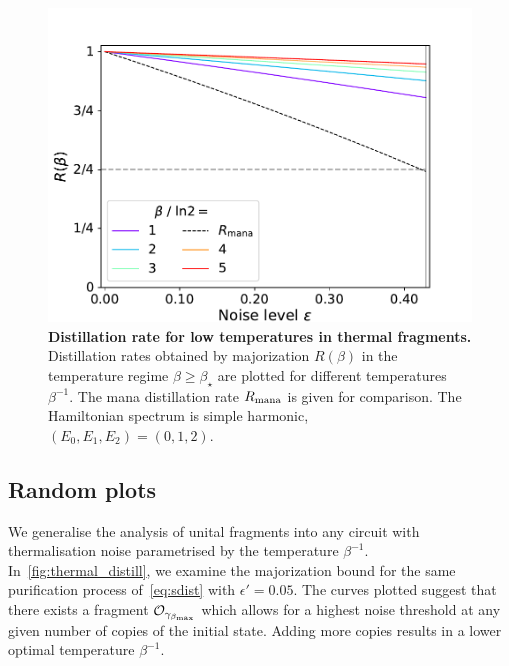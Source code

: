 \documentclass[pra,
aps,
twocolumn,
superscriptaddress,
groupedaddress,
nofootinbib,
reprint
]{revtex4-1}
\begin{document}
\begin{figure}[h]
    \centering
    \includegraphics[scale=0.5]{figs/distill_bounds_lowtemp.pdf}
    \caption{\textbf{Distillation rate for low temperatures in thermal fragments.} Distillation rates obtained by majorization $R(\beta)$ in the temperature regime $\beta \geq \beta_{\star}$ are plotted for different temperatures $\beta^{-1}$.
    The mana distillation rate $R_{\rm{mana}}$ is given for comparison.
    The Hamiltonian spectrum is simple harmonic, $(E_0, E_1, E_2) = (0,1,2)$.
    }
    \label{fig:distill_bounds_lowtemp}
\end{figure}



\null\newpage
\null\newpage

\subsection{Random plots}

We generalise the analysis of unital fragments into any circuit with thermalisation noise parametrised by the temperature $\beta^{-1}$.
In~\cref{fig:thermal_distill}, we examine the majorization bound for the same purification process of~\cref{eq:sdist} with $\epsilon' = 0.05$.
The curves plotted suggest that there exists a fragment $\mathcal{O}_{\gamma_{\beta_{\rm{max}}}}$ which allows for a highest noise threshold at any given number of copies of the initial state.
Adding more copies results in a lower optimal temperature $\beta^{-1}$.
\end{document}
